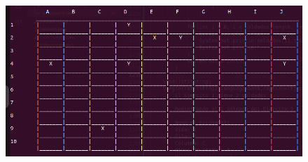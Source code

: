 \documentclass{article}
\begin{document}
	\begin{figure}[H]
		\centering
		\includegraphics[width=1.0\textwidth,keepaspectratio]{img/Commit8.png}
	\end{figure}
\end{document}
